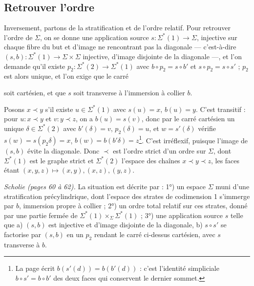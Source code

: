 \documentclass[11pt,a4paper]{article}
\begin{document}
\subsection*{Retrouver l'ordre}

Inversement, partons de la stratification et de l'ordre relatif. Pour retrouver
l'ordre de $\Sigma$, on se donne une application source $s : \Sigma^{*}(1) \to
\Sigma$, injective sur chaque fibre du but et d'image ne rencontrant pas la
diagonale — c'est-à-dire $(s, b) : \Sigma^{*}(1) \to \Sigma \times \Sigma$ injective,
d'image disjointe de la diagonale —, et l'on demande qu'il existe $p_2 :
\Sigma^{*}(2) \to \Sigma^{*}(1)$ avec $b \circ p_2 = s \circ b'$ et $s \circ p_2 = s
\circ s'$ ; $p_2$ est alors unique, et l'on exige que le carré


soit cartésien, et que $s$ soit transverse à l'immersion à collier $b$.

Posons $x \prec y$ s'il existe $u \in \Sigma^{*}(1)$ avec $s(u) = x$, $b(u) = y$.
C'est transitif : pour $u : x \prec y$ et $v : y \prec z$, on a $b(u) = s(v)$, donc
par le carré cartésien un unique $\delta \in \Sigma^{*}(2)$ avec $b'(\delta) = v$,
$p_2(\delta) = u$, et $w = s'(\delta)$ vérifie $s(w) = s(p_2 \delta) = x$, $b(w) =
b(b'\delta) = z$\footnote{La page écrit $b(s'(d)) = b(b'(d))$ : c'est l'identité
simpliciale $b \circ s' = b \circ b'$ des deux faces qui conservent le dernier
sommet.}. C'est irréflexif, puisque l'image de $(s, b)$ évite la diagonale. Donc
$\prec$ est l'ordre strict d'un ordre sur $\Sigma$, dont $\Sigma^{*}(1)$ est le graphe
strict et $\Sigma^{*}(2)$ l'espace des chaînes $x \prec y \prec z$, les faces étant
$(x,y,z) \mapsto (x,y), (x,z), (y,z)$.

\emph{Scholie (pages 60 à 62).} La situation est décrite par : 1°) un espace
$\Sigma$ muni d'une stratification précylindrique, dont l'espace des strates de
codimension 1 s'immerge par $b$, immersion propre à collier ; 2°) un ordre total
relatif sur ces strates, donné par une partie fermée de $\Sigma^{*}(1) \times_\Sigma
\Sigma^{*}(1)$ ; 3°) une application source $s$ telle que a) $(s, b)$ est injective
et d'image disjointe de la diagonale, b) $s \circ s'$ se factorise par $(s, b)$ en un
$p_2$ rendant le carré ci-dessus cartésien, avec $s$ transverse à $b$.
\end{document}
